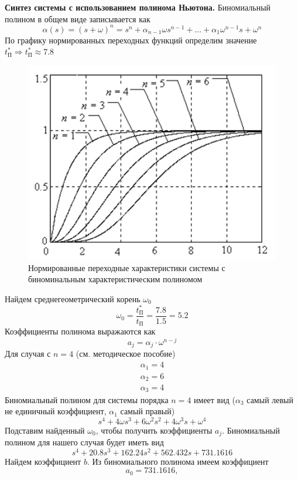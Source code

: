 \documentclass[a4paper, 12pt]{article}
\begin{document}
    \textbf{Синтез системы с использованием полинома Ньютона.}
    Биномиальный полином в общем виде записывается как
    $$\alpha(s)=(s+\omega)^n=s^n+\alpha_{n-1}\omega s^{n-1}+...+\alpha_1\omega^{n-1}s+\omega^n$$
    По графику нормированных переходных функций определим значение $t^*_{\text{П}}\Rightarrow t^*_{\text{П}}\approx7.8$
    \begin{figure}[H]
        \centering
        \includegraphics[scale=0.7]{norm_tf_newton.png}
        \captionsetup{skip=0pt}
        \caption{Нормированные переходные характеристики системы с биноминальным характеристическим полиномом}
        \label{fig:norm_tf_newton}
    \end{figure}
    \noindent Найдем среднегеометрический корень $\omega_0$
    $$\omega_0=\dfrac{t^*_{\text{П}}}{t_{\text{П}}}=\dfrac{7.8}{1.5}=5.2$$
    Коэффициенты полинома выражаются как
    $$a_j=\alpha_j\cdot\omega^{n-j}$$
    Для случая с $n=4$ (см. методическое пособие)
    $$
    \begin{matrix}
    \alpha_1=4\\
    \alpha_2=6\\
    \alpha_3=4
    \end{matrix}
    $$
    Биномиальный полином для системы порядка $n=4$ имеет вид ($\alpha_3$ самый левый не единичный коэффициент, $\alpha_1$ самый правый)
    $$s^4+4\omega s^3+6\omega^2s^2+4\omega^3s+\omega^4$$
    Подставим найденный $\omega_0$, чтобы получить коэффициенты $a_j$. Биномиальный полином для нашего случая будет иметь вид
    $$s^4+20.8s^3+162.24s^2+562.432s+731.1616$$
    Найдем коэффициент $b$. Из биномиального полинома имеем коэффициент $$a_0=731.1616,$$
\end{document}
